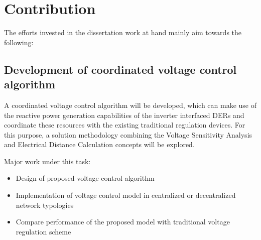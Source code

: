     

\section{Contribution}
The efforts invested in the dissertation work at hand mainly aim towards the following:
 
\subsection{Development of coordinated voltage control algorithm}
A coordinated voltage control algorithm will be developed, which can make use of the reactive power generation capabilities of the inverter interfaced DERs and coordinate these resources with the existing traditional regulation devices. For this purpose, a solution methodology combining the Voltage Sensitivity Analysis \cite{Th_ali} and Electrical Distance Calculation \cite{Alvi3} concepts will be explored.

Major work under this task:
\begin{itemize}
    \item Design of proposed voltage control algorithm 
    \item Implementation of voltage control model in centralized or decentralized network typologies
    \item Compare performance of the proposed model with traditional voltage regulation scheme
\end{itemize}

